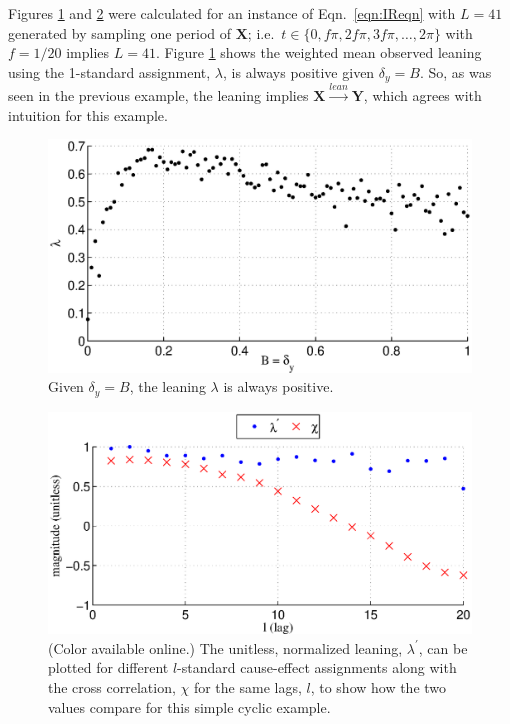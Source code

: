 \documentclass[a4paper,11pt,twocolumn]{article}
\begin{document}
Figures \ref{fig:cyc1} and \ref{fig:cyc2} were calculated for an instance of Eqn.\ \ref{eqn:IReqn} with $L=41$ generated by sampling one period of $\mathbf{X}$; i.e.\ $t\in\{0,f\pi,2f\pi,3f\pi,\ldots,2\pi\}$ with $f=1/20$ implies $L=41$.  Figure \ref{fig:cyc1} shows the weighted mean observed leaning using the 1-standard assignment, $\lambda$, is always positive given $\delta_y=B$.  So, as was seen in the previous example, the leaning implies $\mathbf{X}\xrightarrow{lean}\mathbf{Y}$, which agrees with intuition for this example. 
\begin{figure}[ht]
\includegraphics[scale=0.45]{SimpleCyclicexample_Bxytol.eps}
\caption{Given $\delta_y=B$, the leaning $\lambda$ is always positive.}
\label{fig:cyc1}
\end{figure}
\begin{figure}[ht]
\includegraphics[scale=0.40]{SimpleCyclicexample_difflags.eps}
\caption{(Color available online.) The unitless, normalized leaning, $\lambda^\prime$, can be plotted for different $l$-standard cause-effect assignments along with the cross correlation, $\chi$ for the same lags, $l$, to show how the two values compare for this simple cyclic example.}
\label{fig:cyc2}
\end{figure}
\end{document}
